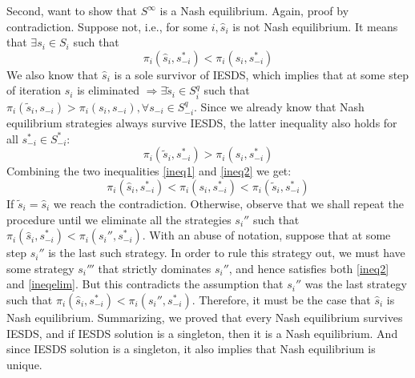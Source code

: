 \documentclass[]{article}
\begin{document}
Second, want to show that $S^\infty$ is a Nash equilibrium. Again, proof by contradiction. Suppose not, i.e., for some $i, \hat{s}_i$ is not Nash equilibrium. It means that $\exists s_i\in S_i$ such that
\begin{equation}\label{ineq1}
	\pi_i(\hat{s}_i, s_{-i}^*) < \pi_i(s_i, s_{-i}^*)
\end{equation}
We also know that $\hat{s}_i$ is a sole survivor of IESDS, which implies that at some step of iteration $s_i$ is eliminated $\Longrightarrow\exists\tilde{s}_i\in S_{i}^q$ such that $\pi_i(\tilde{s}_i, s_{-i}) > \pi_i(s_i, s_{-i}), \forall s_{-i}\in S_{-i}^q$. Since we already know that Nash equilibrium strategies always survive IESDS,  the latter inequality also holds for all $s_{-i}^*\in S_{-i}^*$:
\begin{equation}\label{ineq2}
	\pi_i(\tilde{s}_i, s_{-i}^*) > \pi_i(s_i, s_{-i}^*)
\end{equation}
Combining the two inequalities \ref{ineq1} and \ref{ineq2} we get:
\begin{equation}\label{ineqelim}
	\pi_i(\hat{s}_i, s_{-i}^*) < \pi_i(s_i, s_{-i}^*) < \pi_i(\tilde{s}_i, s_{-i}^*)\nonumber
\end{equation}
If $\tilde{s}_i = \hat{s}_i$ we reach the contradiction. Otherwise, observe that we shall repeat the procedure until we eliminate all the strategies $s_i''$ such that $\pi_i(\hat{s}_i, s_{-i}^*) < \pi_i(s_i'', s_{-i}^*)$. With an abuse of notation, suppose that at some step $s_i''$  is the last such strategy. In order to rule this strategy out,  we must have some strategy $s_i'''$ that strictly dominates $s_i''$, and hence satisfies both \ref{ineq2} and \ref{ineqelim}. But this contradicts the assumption that $s_i''$ was the last strategy such that $\pi_i(\hat{s}_i, s_{-i}^*) < \pi_i(s_i'', s_{-i}^*)$. Therefore, it must be the case that $\hat{s}_i$ is Nash equilibrium.
Summarizing, we proved that every Nash equilibrium survives IESDS, and if IESDS solution is a singleton, then it is a Nash equilibrium. And since IESDS solution is a singleton, it also implies that Nash equilibrium is unique.
\end{document}
